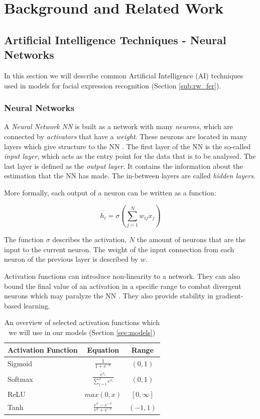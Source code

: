 \section{Background and Related Work}
\label{sec:related}

\subsection{Artificial Intelligence Techniques - Neural Networks}
\label{sub:aiml}
In this section we will describe common Artificial Intelligence (AI) techniques used in models for  facial expression recognition (Section \ref{sub:rw_fer}).
\subsubsection{Neural Networks}
A \emph{Neural Network NN} is built as a network with many \emph{neurons}, which are connected by \emph{activators} that have a \emph{weight}. These neurons are located in many layers which give structure to the NN \cite{schmidhuber2015deep}. The first layer of the NN is the so-called \emph{input layer}, which acts as the entry point for the data that is to be analysed. The last layer is defined as the \emph{output layer}. It contains the information about the estimation that the NN has made. The in-between layers are called \emph{hidden layers}.

More formally, each output of a neuron can be written as a function:

\begin{equation}
    h_i = \sigma (\sum_{j=1}^{N} w_{ij}x_{j})
\end{equation}

The function $\sigma$ describes the activation, $N$ the amount of neurons that are the input to the current neuron. The weight of the input connection from each neuron of the previous layer is described by $w$.

Activation functions can introduce non-linearity to a network. They can also bound the final value of an activation in a specific range to combat divergent neurons which may paralyze the NN \cite{wang2003artificial}. They also provide stability in gradient-based learning.
\bgroup
\def\arraystretch{2}
\begin{table}[]
    \centering
    \begin{tabular}{l|c|c}
        \textbf{Activation Function} & \textbf{Equation} & \textbf{Range} \\ \hline \hline
         Sigmoid & $\frac{1}{1 + e^{-x}}$ &  $(0,1)$\\\hline
         Softmax & $\frac{e^{x_i}}{\sum_{j=1}^{J} e^{x_i}}$ & $(0,1)$\\\hline
         ReLU & $max(0, x)$ & $[0, \infty]$ \\\hline
         Tanh & $\frac{e^x - e^{-x}}{e^x + e^{-x}}$ & $(-1, 1)$\\\hline
    \end{tabular}
    \caption{An overview of selected activation functions which we will use in our models (Section \ref{sec:models})}
    \label{tab:my_label}
\end{table}
\egroup

